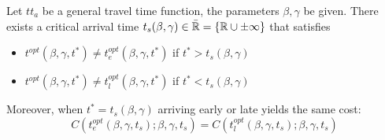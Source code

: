 \begin{prop}
  Let \(tt_a\) be a general travel time function, the parameters \(\beta, \gamma\) be given.
  There exists a critical arrival time \(t_s(\beta, \gamma) \in \bar{\mathbb{R}} = \{\mathbb{R} \cup \pm \infty\}\) that satisfies
  \begin{itemize}
  \item \(t^{opt}(\beta, \gamma, t^*) \neq t_e^{opt}(\beta, \gamma, t^*)\) if \(t^* > t_s(\beta, \gamma)\)
  \item \(t^{opt}(\beta, \gamma, t^*) \neq t_l^{opt}(\beta, \gamma, t^*)\) if \(t^* < t_s(\beta, \gamma)\)
  \end{itemize}

  Moreover, when \(t^* = t_s(\beta, \gamma)\) arriving early or late yields the same cost:
  \begin{equation*}
    C(t_e^{opt}(\beta, \gamma, t_s); \beta, \gamma, t_s) = C(t_l^{opt}(\beta, \gamma, t_s); \beta, \gamma, t_s)
  \end{equation*}
\end{prop}
